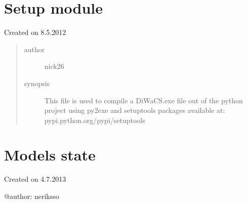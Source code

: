 \documentclass[letterpaper,10pt,english]{sphinxmanual}
\begin{document}
\section{Setup module}
\label{setup:setup-module}\label{setup::doc}
Created on 8.5.2012
\begin{quote}\begin{description}
\item[{author}] \leavevmode
nick26

\item[{synopsis}] \leavevmode
This file is used to compile a DiWaCS.exe file out of the python project
using py2exe and setuptools packages available at:
pypi.python.org/pypi/setuptools

\end{description}\end{quote}


\section{Models state}
\label{state:module-state}\label{state::doc}\label{state:models-state}
Created on 4.7.2013

@author: neriksso
\end{document}
